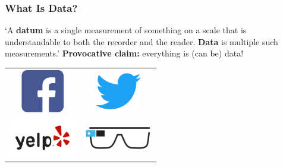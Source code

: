 \documentclass[12pt,t]{beamer}
\begin{document}
\begin{frame}  
  \frametitle{What Is Data?}
`A \textbf{datum} is a single measurement of something on a scale that is understandable to both the recorder and the reader. \textbf{Data} is multiple such measurements.'
\vskip0.2cm
\textbf{Provocative claim:} everything is (can be) data!
\begin{center}
\begin{tabular}{cc}
  \includegraphics[width=20mm]{facebook} & \includegraphics[width=20mm]{twitter}\\
    \includegraphics[width=30mm]{yelp} &   \includegraphics[width=30mm]{googleglass}
\end{tabular}
\end{center}
\end{frame}
\end{document}
